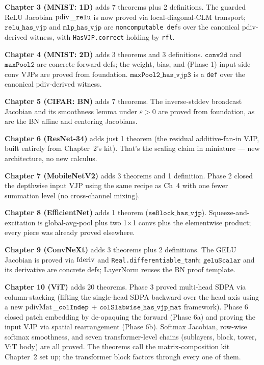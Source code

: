 \textbf{Chapter 3 (MNIST: 1D)} adds 7 theorems plus 2 definitions.
The guarded ReLU Jacobian \(\operatorname{pdiv}\_\texttt{relu}\) is now proved
via local-diagonal-CLM transport; \(\texttt{relu\_has\_vjp}\)
and \(\texttt{mlp\_has\_vjp}\) are \texttt{noncomputable def}s
over the canonical pdiv-derived witness, with
\texttt{HasVJP.correct} holding by \texttt{rfl}.

\textbf{Chapter 4 (MNIST: 2D)} adds 3 theorems and 3 definitions.
\(\texttt{conv2d}\) and \(\texttt{maxPool2}\) are concrete
forward defs; the weight, bias, and (Phase 1) input-side conv
VJPs are proved from foundation.
\(\texttt{maxPool2\_has\_vjp3}\) is a \texttt{def} over the
canonical pdiv-derived witness.

\textbf{Chapter 5 (CIFAR: BN)} adds 7 theorems. The inverse-stddev
broadcast Jacobian and its smoothness lemma under
\(\varepsilon > 0\) are proved from foundation, as are the
BN affine and centering Jacobians.

\textbf{Chapter 6 (ResNet-34)} adds just 1 theorem (the
residual additive-fan-in VJP, built entirely from Chapter~2's
kit). That's the scaling claim in miniature --- new
architecture, no new calculus.

\textbf{Chapter 7 (MobileNetV2)} adds 3 theorems and 1 definition.
Phase 2 closed the depthwise input VJP using the same recipe
as Ch~4 with one fewer summation level (no cross-channel mixing).

\textbf{Chapter 8 (EfficientNet)} adds 1 theorem
(\(\texttt{seBlock\_has\_vjp}\)). Squeeze-and-excitation is
global-avg-pool plus two 1\(\times\)1 convs plus the elementwise
product; every piece was already proved elsewhere.

\textbf{Chapter 9 (ConvNeXt)} adds 3 theorems plus 2 definitions.
The GELU Jacobian is proved via \(\operatorname{fderiv}\) and
\texttt{Real.differentiable\_tanh}; \(\texttt{geluScalar}\) and
its derivative are concrete defs; LayerNorm reuses the BN
proof template.

\textbf{Chapter 10 (ViT)} adds 20 theorems.
Phase 3 proved multi-head SDPA via column-stacking (lifting the
single-head SDPA backward over the head axis using a new
\(\operatorname{pdivMat}\_\texttt{colIndep}\) +
\(\texttt{colSlabwise\_has\_vjp\_mat}\) framework). Phase 6 closed
patch embedding by de-opaquing the forward (Phase 6a) and proving
the input VJP via spatial rearrangement (Phase 6b). Softmax
Jacobian, row-wise softmax smoothness, and seven
transformer-level chains (sublayers, block, tower, ViT body) are
all proved. The theorems call the matrix-composition kit
Chapter~2 set up; the transformer block factors through every
one of them.

